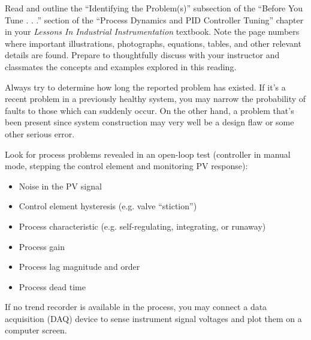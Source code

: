 

Read and outline the ``Identifying the Problem(s)'' subsection of the ``Before You Tune . . .'' section of the ``Process Dynamics and PID Controller Tuning'' chapter in your {\it Lessons In Industrial Instrumentation} textbook.  Note the page numbers where important illustrations, photographs, equations, tables, and other relevant details are found.  Prepare to thoughtfully discuss with your instructor and classmates the concepts and examples explored in this reading.














Always try to determine how long the reported problem has existed.  If it's a recent problem in a previously healthy system, you may narrow the probability of faults to those which can suddenly occur.  On the other hand, a problem that's been present since system construction may very well be a design flaw or some other serious error.

\vskip 10pt

Look for process problems revealed in an open-loop test (controller in manual mode, stepping the control element and monitoring PV response):

\begin{itemize}
\item{} Noise in the PV signal
\item{} Control element hysteresis (e.g. valve ``stiction'')
\item{} Process characteristic (e.g. self-regulating, integrating, or runaway)
\item{} Process gain
\item{} Process lag magnitude and order
\item{} Process dead time
\end{itemize}

\vskip 10pt

If no trend recorder is available in the process, you may connect a data acquisition (DAQ) device to sense instrument signal voltages and plot them on a computer screen.






